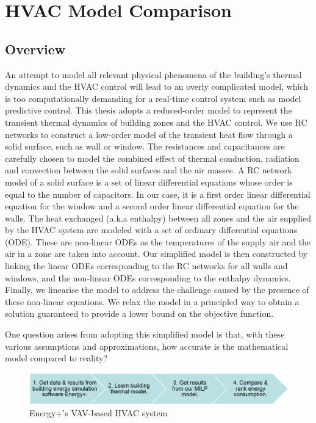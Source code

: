 \appendix
\chapter{HVAC Model Comparison}
\label{cha:ep}

\section{Overview}

An attempt to model all relevant physical phenomena of the building's thermal dynamics and the HVAC control will lead to an overly complicated model, which is too computationally demanding for a real-time control system such as model predictive control.
This thesis adopts a reduced-order model to represent the transient thermal dynamics of building zones and the HVAC control. 
We use RC networks to construct a low-order model of the transient heat flow through a solid surface, such as wall or window. The resistances and capacitances are carefully chosen to model the combined effect of thermal conduction, radiation and convection between the solid surfaces and the air masses. A RC network model of a solid surface is a set of linear differential equations whose order is equal to the number of capacitors. In our case, it is a first order linear differential equation for the window and a second order linear differential equation for the walls. The heat exchanged (a.k.a enthalpy) between all zones and the air supplied by the HVAC system are modeled with a set of ordinary differential equations (ODE). These are non-linear ODEs as the temperatures of the supply air and the air in a zone are taken into account. Our simplified model is then constructed by linking the linear ODEs corresponding to the RC networks for all walls and windows, and the non-linear ODEs corresponding to the enthalpy dynamics. Finally, we linearise the model to address the challenge caused by the presence of these non-linear equations. We relax the model in a principled way to obtain a solution guaranteed to provide a lower bound on the objective function.

One question arises from adopting this simplified model is that, with these various assumptions and approximations, how accurate is the mathematical model compared to reality? 

\begin{figure}
	\centering
		\includegraphics[width=0.9\linewidth,keepaspectratio]{./figs/app_flow.png}		
	\caption{Energy+'s VAV-based HVAC system}
	\label{fig:epflow}
\end{figure}

